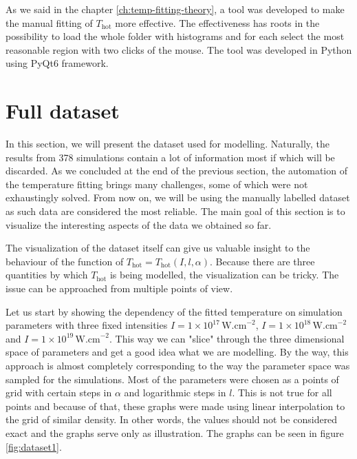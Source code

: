 As we said in the chapter \ref{ch:temp-fitting-theory}, a tool was developed to make the manual fitting of $T_{\mathrm{hot}}$ more effective. The effectiveness has roots in the possibility to load the whole folder with histograms and for each select the most reasonable region with two clicks of the mouse. The tool was developed in Python using PyQt6 framework.

\section{Full dataset}
In this section, we will present the dataset used for modelling. Naturally, the results from 378 simulations contain a lot of information most if which will be discarded. As we concluded at the end of the previous section, the automation of the temperature fitting brings many challenges, some of which were not exhaustingly solved. From now on, we will be using the manually labelled dataset as such data are considered the most reliable. The main goal of this section is to visualize the interesting aspects of the data we obtained so far.

The visualization of the dataset itself can give us valuable insight to the behaviour of the function of $T_{\mathrm{hot}} = T_{\mathrm{hot}}(I,l,\alpha)$. Because there are three quantities by which $T_{\mathrm{hot}}$ is being modelled, the visualization can be tricky. The issue can be approached from multiple points of view.

Let us start by showing the dependency of the fitted temperature on simulation parameters with three fixed intensities $I = 1 \times 10^{17} \,\mathrm{W.cm}^{-2}$, $I = 1 \times 10^{18} \,\mathrm{W.cm}^{-2}$ and $I = 1 \times 10^{19} \,\mathrm{W.cm}^{-2}$. This way we can "slice" through the three dimensional space of parameters and get a good idea what we are modelling. By the way, this approach is almost completely corresponding to the way the parameter space was sampled for the simulations. Most of the parameters were chosen as a points of grid with certain steps in $\alpha$ and logarithmic steps in $l$. This is not true for all points and because of that, these graphs were made using linear interpolation to the grid of similar density. In other words, the values should not be considered exact and the graphs serve only as illustration. The graphs can be seen in figure \ref{fig:dataset1}.

